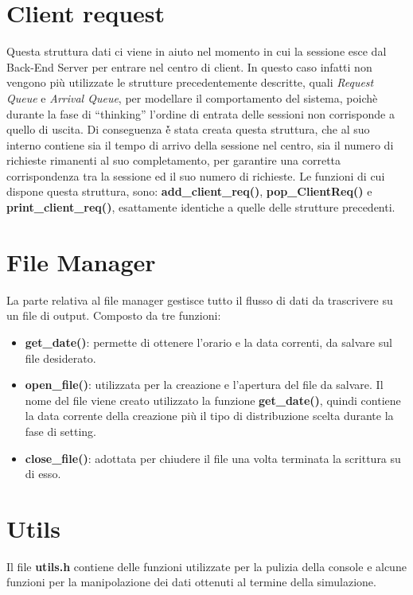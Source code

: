 \section{Client request}
Questa struttura dati ci viene in aiuto nel momento in cui la sessione 
esce dal Back-End Server per entrare nel centro di client. In questo caso 
infatti non vengono pi\`u utilizzate le strutture precedentemente descritte,
quali \textit{Request Queue} e \textit{Arrival Queue}, per modellare il comportamento 
del sistema, poichè durante la fase di ``thinking'' l'ordine di entrata delle sessioni 
non corrisponde a quello di uscita. Di conseguenza \'è stata creata questa struttura,
che al suo interno contiene sia il tempo di arrivo della sessione nel centro, sia il numero
di richieste rimanenti al suo completamento, per garantire una corretta corrispondenza tra la sessione ed il suo numero di richieste.
Le funzioni di cui dispone questa struttura, sono: 
\textbf{add\_client\_req()}, \textbf{pop\_ClientReq()} e 
\textbf{print\_client\_req()}, esattamente identiche a quelle delle strutture 
precedenti.

\section{File Manager}
La parte relativa al file manager gestisce tutto il flusso di dati da 
trascrivere  su un file di output. Composto da tre funzioni:
\begin{itemize}
\item \textbf{get\_date()}: permette di ottenere l'orario e la data correnti, 
da 
salvare sul file desiderato.
\item \textbf{open\_file()}: utilizzata per la creazione e l'apertura 
del file da salvare. Il nome del file viene creato utilizzato la funzione 
\textbf{get\_date()}, quindi contiene la data corrente della creazione più il 
tipo di 
distribuzione scelta durante la fase di setting.
\item \textbf{close\_file()}: adottata per chiudere il file una volta 
terminata la scrittura su di esso.
\end{itemize}

\section{Utils}
Il file \textbf{utils.h} contiene delle funzioni utilizzate per la pulizia della 
console 
e alcune funzioni per la manipolazione dei dati ottenuti al termine della 
simulazione.

